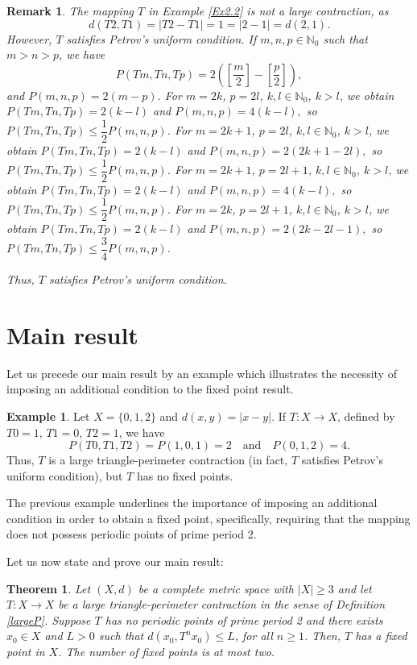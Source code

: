 \documentclass[12 pt]{article}
\theoremstyle{lema}
\theoremstyle{proposition}
\theoremstyle{theorem}
\newtheorem{theorem}{Theorem}[section]
\theoremstyle{theorem}
\newtheorem{remark}{Remark}[section]
\theoremstyle{corollary}
\theoremstyle{definition}
\theoremstyle{example}
\newtheorem{example}{Example}[section]
\def\n{\mathbb N}
\begin{document}
	\begin{remark}
		The mapping \(T\) in Example \ref{Ex2.2} is not a large contraction, as 
		\[d(T2,T1) = |T2-T1| = 1 = |2-1| = d(2,1).\]
		However, \(T\) satisfies Petrov's uniform condition.
		If \(m,n,p \in \n_0\) such that \(m>n>p\), we have 
		\[P(Tm,Tn,Tp) = 2\left(\left[\dfrac{m}{2}\right] - \left[\dfrac{p}{2}\right]\right),\]
		and \(P(m,n,p) = 2(m-p)\).
		For \(m=2k\), \(p=2l\), \(k,l \in \n_0\), \(k >l\), we obtain \(P(Tm,Tn,Tp) = 2(k-l)\) and \(P(m,n,p) = 4(k-l),\) so \(P(Tm,Tn,Tp) \leq \dfrac12 P(m,n,p)\).
		For \(m=2k+1\), \(p=2l\), \(k,l \in \n_0\), \(k >l\), we obtain \(P(Tm,Tn,Tp) = 2(k-l)\) and \(P(m,n,p) = 2(2k+1-2l),\) so \(P(Tm,Tn,Tp) \leq \dfrac12 P(m,n,p)\).
		For \(m=2k+1\), \(p=2l+1\), \(k,l \in \n_0\), \(k >l\), we obtain \(P(Tm,Tn,Tp) = 2(k-l)\) and \(P(m,n,p) = 4(k-l),\) so \(P(Tm,Tn,Tp) \leq \dfrac12 P(m,n,p)\).
		For \(m=2k\), \(p=2l+1\), \(k,l \in \n_0\), \(k >l\), we obtain \(P(Tm,Tn,Tp) = 2(k-l)\) and \(P(m,n,p) = 2(2k-2l-1),\) so \(P(Tm,Tn,Tp) \leq \dfrac34 P(m,n,p)\).
		
		Thus, \(T\) satisfies Petrov's uniform condition.
	\end{remark}


	\section{Main result}
	
	Let us precede our main result by an example which illustrates the necessity of imposing an additional condition to the fixed point result. 
	
	\begin{example}
		Let \(X=\{0,1,2\}\) and \(d(x,y)=|x-y|\). If $T \colon X\to X$, defined by \(T0=1\), \(T1=0\), \(T2=1\), we have 
		\[P(T0,T1,T2) = P(1,0,1) = 2 \quad \text{and} \quad P(0,1,2)=4.\]
		Thus, \(T\) is a large triangle-perimeter contraction (in fact, \(T\) satisfies Petrov's uniform condition), but \(T\) has no fixed points.
	\end{example}

	The previous example underlines the importance of imposing an additional condition in order to obtain a fixed point, specifically, requiring that the mapping does not possess periodic points of prime period 2.
	
	Let us now state and prove our main result:

	\begin{theorem}
		Let $(X,d)$ be a complete metric space with  $|X|\geq 3$ and let $T \colon X\to X$ be a large triangle-perimeter contraction in the sense of Definition \ref{largeP}. Suppose \(T\) has no periodic points of prime period 2 and there exists $x_0 \in X$ and \(L>0\) such that \(d(x_0, T^nx_0)\leq L \), for all \(n \geq 1\). Then, \(T\) has a fixed point in \(X\). The number of fixed points is at most two.
	\end{theorem}
\end{document}
